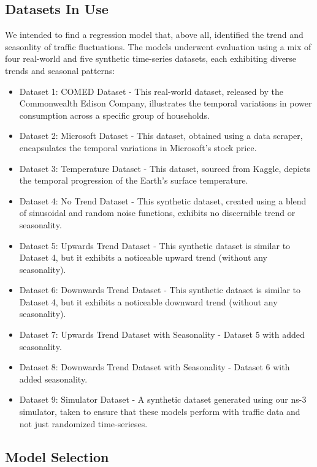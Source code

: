 \subsection{Datasets In Use}

We intended to find a regression model that, above all, identified the trend and seasonlity of traffic fluctuations.
The models underwent evaluation using a mix of four real-world and five synthetic time-series datasets, each exhibiting diverse trends and seasonal patterns:

\begin{itemize}
  \item Dataset 1: COMED Dataset - This real-world dataset, released by the Commonwealth Edison Company, illustrates the temporal variations in power consumption across a specific group of households.
  \item Dataset 2: Microsoft Dataset - This dataset, obtained using a data scraper, encapsulates the temporal variations in Microsoft's stock price.
  \item Dataset 3: Temperature Dataset - This dataset, sourced from Kaggle, depicts the temporal progression of the Earth's surface temperature.
  \item Dataset 4: No Trend Dataset - This synthetic dataset, created using a blend of sinusoidal and random noise functions, exhibits no discernible trend or seasonality.
  \item Dataset 5: Upwards Trend Dataset - This synthetic dataset is similar to Dataset 4, but it exhibits a noticeable upward trend (without any seasonality).
  \item Dataset 6: Downwards Trend Dataset - This synthetic dataset is similar to Dataset 4, but it exhibits a noticeable downward trend (without any seasonality).
  \item Dataset 7: Upwards Trend Dataset with Seasonality - Dataset 5 with added seasonality.
  \item Dataset 8: Downwards Trend Dataset with Seasonality - Dataset 6 with added seasonality.
  \item Dataset 9: Simulator Dataset - A synthetic dataset generated using our ns-3 simulator, taken to ensure that these models perform with traffic data and not just randomized time-serieses.
\end{itemize}

\subsection{Model Selection}


